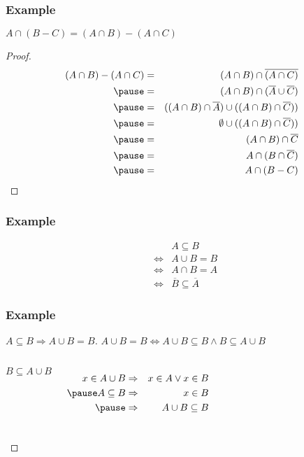 \documentclass[dvipsnames]{beamer}
\begin{document}
\begin{frame}
  \frametitle{Example}

  \begin{theorem}
    $A \cap (B-C) = (A \cap B) - (A \cap C)$
  \end{theorem}

  \pause
  \begin{proof}
    \vspace{-2em}
    \begin{eqnarray*}
      (A \cap B) - (A \cap C)
          & = & (A \cap B) \cap \overline{(A \cap C)}\\\pause
          & = & (A \cap B) \cap (\overline{A} \cup \overline{C})\\\pause
          & = & ((A \cap B) \cap \overline{A}) \cup ((A \cap B) \cap \overline{C}))\\\pause
          & = & \emptyset \cup ((A \cap B) \cap \overline{C}))\\\pause
          & = & (A \cap B) \cap \overline{C}\\\pause
          & = & A \cap (B \cap \overline{C})\\\pause
          & = & A \cap (B - C)
    \end{eqnarray*}
  \end{proof}
\end{frame}

\begin{frame}
  \frametitle{Example}

  \begin{theorem}
    \begin{eqnarray*}
      &                 & A \subseteq B\\
      & \Leftrightarrow & A \cup B = B\\
      & \Leftrightarrow & A \cap B = A\\
      & \Leftrightarrow & \overline{B} \subseteq \overline{A}
    \end{eqnarray*}
  \end{theorem}
\end{frame}

\begin{frame}
  \frametitle{Example}

  \begin{proof}[$A \subseteq B \Rightarrow A \cup B = B$]
    $A \cup B = B \Leftrightarrow
      A \cup B \subseteq B \wedge B \subseteq A \cup B$

    \pause
    \bigskip
    \begin{columns}
      $B \subseteq A \cup B$

      \pause
      \medskip
      \begin{eqnarray*}
        x \in A \cup B & \Rightarrow & x \in A \vee x \in B\\\pause
        A \subseteq B  & \Rightarrow & x \in B\\\pause
                       & \Rightarrow & A \cup B \subseteq B
      \end{eqnarray*}
    \end{columns}
  \end{proof}
\end{frame}
\end{document}
